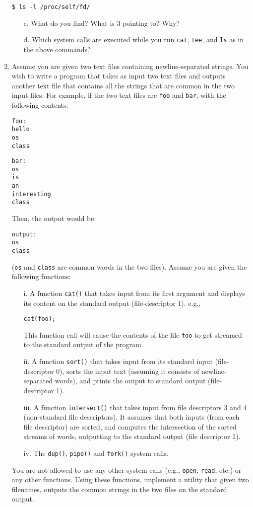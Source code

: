 \begin{enumerate}
\begin{verbatim}
$ ls -l /proc/self/fd/
\end{verbatim}

\begin{enumerate}
\item[c.] What do you find? What is 3 pointing to? Why?
\item[d.] Which system calls are executed while you run {\tt cat}, {\tt tee}, and {\tt ls} as in the above commands?
\end{enumerate}

\item Assume you are given two text files containing newline-separated strings. You wish to write
a program that takes as input two text files and outputs another text file that contains all the
strings that are common in the two input files. For example, if the two text files are {\tt foo}
and {\tt bar}, with the following contents:
\begin{verbatim}
foo:
hello
os
class
\end{verbatim}
\begin{verbatim}
bar:
os
is
an
interesting
class
\end{verbatim}
Then, the output would be:
\begin{verbatim}
output:
os
class
\end{verbatim}
({\tt os} and {\tt class} are common words in the two files). Assume you are given the following
functions:
\begin{enumerate}
\item[i.] A function {\tt cat()} that takes input from its first argument and displays its
content on the standard output (file-descriptor 1). e.g.,
\begin{verbatim}
cat(foo);
\end{verbatim}
This function call will cause the contents of the file {\tt foo} to get streamed to the standard
output of the program.
\item[ii.] A function {\tt sort()} that takes input from its standard input (file-descriptor 0),
sorts the input text (assuming it consists of newline-separated words), and prints the output
to standard output (file-descriptor 1).
\item[iii.] A function {\tt intersect()} that takes input from file descriptors 3 and 4 (non-standard
file descriptors). It assumes that both inputs (from each file descriptor) are sorted, and computes
the intersection of the sorted streams of words, outputting to the standard output (file descriptor 1).
\item[iv.] The {\tt dup()}, {\tt pipe()} and {\tt fork()} system calls.
\end{enumerate}
You are not allowed to use any other system calls (e.g., {\tt open}, {\tt read}, etc.) or any
other functions. Using these functions, implement a utility that given two filenames, outputs
the common strings in the two files on the standard output.


\end{enumerate}
